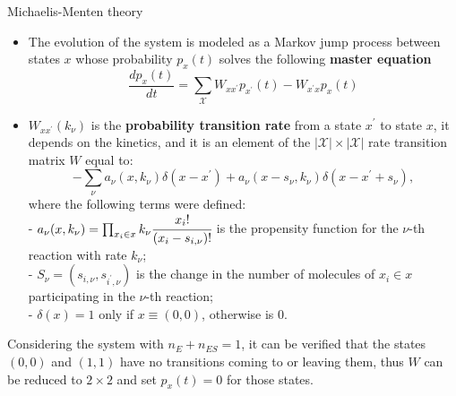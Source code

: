 \documentclass[final]{beamer}
\newlength{\colwidth}
\begin{document}
\begin{frame}[t]
\begin{columns}[t]
\begin{column}{\colwidth}
\begin{block}{Michaelis-Menten theory}
\begin{itemize}
\justifying
\item The evolution of the system is modeled as a Markov jump process between states $x$ whose probability $p_x(t)$ solves the following {\bf master equation}\cite{van2007stochastic,GILLESPIE1976403}
%
\begin{equation}
\frac{dp_{x}(t)}{dt} = \sum_{\mathcal{X}} W_{xx^\prime} p_{x^\prime}(t) -  W_{x^\prime x}p_{x}(t) \label{eq CME}
\end{equation}
\item $W_{x x^\prime }(k_\nu)$ is the {\bf probability transition rate} from a state $x^\prime$ to state $x$, it depends on the kinetics, and it is an element of the $|\mathcal{X}|\times|\mathcal{X}|$ rate transition matrix $W$ equal to\cite{Munsky_2006}:
\begin{equation*}
-\sum_\nu a_\nu({x},k_\nu) \delta(x - x^\prime) + a_\nu({x} - s_\nu,k_\nu) \delta(x - x^\prime + s_\nu),
\end{equation*}
\vskip-20pt
where the following terms were defined:\\

- $a_\nu({x},k_\nu) = \prod_{x_i \in x} k_\nu \cfrac{{x_i}!}{({x}_{i} - s_{i,\nu})!}$ is the propensity function for the $\nu$-th reaction with rate $k_\nu$;\\

- $S_\nu = (s_{i,\nu},s_{i^\prime,\nu})$ is the change in the number of molecules of $x_i \in x$ participating in the $\nu$-th reaction;\\
- $\delta(x) = 1$ only if $x \equiv (0,0)$, otherwise is $0$.
%
\end{itemize}
%

Considering the system with $n_E+n_{ES}=1$, it can be verified that the states $(0,0)$ and $(1,1)$ have no transitions coming to or leaving them, thus $W$ can be reduced to $2 \times 2$ and set $p_x(t) = 0$ for those states. 
\end{block}



\end{column}


\end{columns}
\end{frame}
\end{document}
